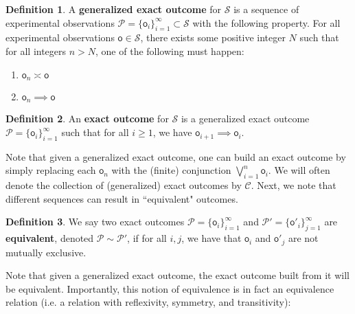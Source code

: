 \documentclass[review]{elsarticle}
\theoremstyle{plain}%
\theoremstyle{definition}
\newtheorem{defn}{Definition}[section]
\theoremstyle{remark}
\begin{document}
\begin{defn}
A \textbf{generalized exact outcome} for $\mathcal{S}$ is a sequence of experimental observations $\mathcal{P} = \{\mathsf{o}_i\}_{i=1}^{\infty}\subset\mathcal{S}$ with the following property. For all experimental observations $\mathsf{o}\in\mathcal{S}$, there exists some positive integer $N$ such that for all integers $n>N$, one of the following must happen:
\begin{enumerate}
\item $\mathsf{o}_n \asymp \mathsf{o}$ 
\item $\mathsf{o}_n \implies \mathsf{o}$
\end{enumerate}
\end{defn}

\begin{defn}
An \textbf{exact outcome} for $\mathcal{S}$ is a generalized exact outcome $\mathcal{P} = \{\mathsf{o}_i\}_{i=1}^{\infty}$ such that for all $i\geq1$, we have $\mathsf{o}_{i+1}\implies\mathsf{o}_i$.
\end{defn}
Note that given a generalized exact outcome, one can build an exact outcome by simply replacing each $\mathsf{o}_n$ with the (finite) conjunction $\bigvee_{i=1}^n\mathsf{o}_i$. We will often denote the collection of (generalized) exact outcomes by $\mathcal{C}$. Next, we note that different sequences can result in ``equivalent" outcomes. 

\begin{defn}
We say two exact outcomes $\mathcal{P} = \{\mathsf{o}_i\}_{i=1}^{\infty}$ and $\mathcal{P}' = \{\mathsf{o}'_i\}_{j=1}^{\infty}$ are \textbf{equivalent}, denoted $\mathcal{P}\sim\mathcal{P}'$, if for all $i,j$, we have that $\mathsf{o}_i$ and $\mathsf{o}'_j$ are not mutually exclusive. 
\end{defn}

Note that given a generalized exact outcome, the exact outcome built from it will be equivalent. Importantly, this notion of equivalence is in fact an equivalence relation (i.e. a relation with reflexivity, symmetry, and transitivity):
\end{document}
